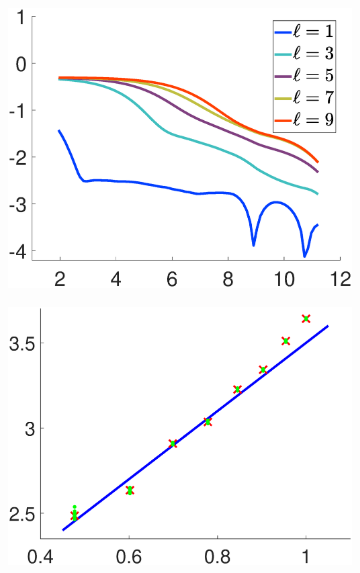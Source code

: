 {\begin{figure}
\hfill
\begin{subfigure}{0.24\textwidth}
\includegraphics[width = \textwidth]{./figures-1D/weighted_train.eps}
\subcaption{}
\label{fig:weighted_train-1D}
\end{subfigure}
\hfill
\begin{subfigure}{0.24\textwidth}
\includegraphics[width = \textwidth]{./figures-1D/iterations.eps}
\subcaption{}
\label{fig:iterations-1D}
\end{subfigure}

\end{figure}}
